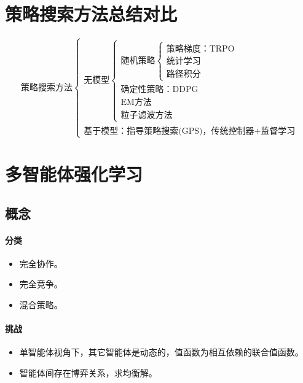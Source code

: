 \documentclass[
12pt, %
a4paper, 
oneside, %
headinclude,footinclude, %
]{scrartcl}
\begin{document}
\section{策略搜索方法总结对比}
$$
\text{策略搜索方法} \begin{cases} 
\text{无模型} \begin{cases} 
\text{随机策略} \begin{cases} 
\text{策略梯度：TRPO} \\ \text{统计学习} \\ \text{路径积分} \end{cases} \\ 
\text{确定性策略：DDPG} \\ \text{EM方法} \\ \text{粒子滤波方法} \end{cases} \\ 
\text{基于模型：指导策略搜索(GPS)，传统控制器+监督学习} \end{cases}
$$
\section{多智能体强化学习}
\subsection[概念]{概念}
\begin{minipage}{0.3\textwidth}
\paragraph{分类}
\begin{itemize}
\item 完全协作。
\item 完全竞争。
\item 混合策略。
\end{itemize}
\end{minipage}
\hfill
\begin{minipage}{0.6\textwidth}
\paragraph{挑战}
\begin{itemize}
\item 单智能体视角下，其它智能体是动态的，值函数为相互依赖的联合值函数。
\item 智能体间存在博弈关系，求均衡解。
\end{itemize}
\end{minipage}
\end{document}

